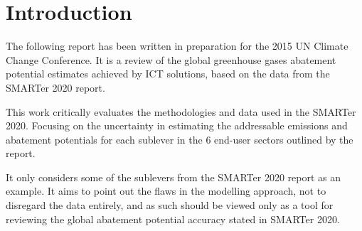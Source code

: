 \section{Introduction}

The following report has been written in preparation for the 2015 UN Climate Change Conference. It is a review of the global greenhouse gases abatement potential estimates achieved by ICT solutions, based on the data from the SMARTer 2020 report.

This work critically evaluates the methodologies and data used in the SMARTer 2020. Focusing on the uncertainty in estimating the addressable emissions and abatement potentials for each sublever in the 6 end-user sectors outlined by the report.

It only considers some of the sublevers from the SMARTer 2020 report as an example. It aims to point out the flaws in the modelling approach, not to disregard the data entirely, and as such should be viewed only as a tool for reviewing the global abatement potential accuracy stated in SMARTer 2020.
